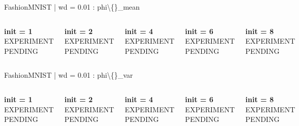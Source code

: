 \documentclass[aspectratio=169]{beamer}
\begin{document}
\begin{frame}{FashionMNIST | wd = 0.01 : phi\textbackslash\{\}\_mean}
\begin{columns}[T,onlytextwidth]

    \centering
\textbf{init = 1}\\[0.5em]
\vfill
{\Large EXPERIMENT PENDING}
\vfill

    \centering
\textbf{init = 2}\\[0.5em]
\vfill
{\Large EXPERIMENT PENDING}
\vfill

    \centering
\textbf{init = 4}\\[0.5em]
\vfill
{\Large EXPERIMENT PENDING}
\vfill

    \centering
\textbf{init = 6}\\[0.5em]
\vfill
{\Large EXPERIMENT PENDING}
\vfill

    \centering
\textbf{init = 8}\\[0.5em]
\vfill
{\Large EXPERIMENT PENDING}
\vfill
\end{columns}
\end{frame}
\begin{frame}{FashionMNIST | wd = 0.01 : phi\textbackslash\{\}\_var}
\begin{columns}[T,onlytextwidth]

    \centering
\textbf{init = 1}\\[0.5em]
\vfill
{\Large EXPERIMENT PENDING}
\vfill

    \centering
\textbf{init = 2}\\[0.5em]
\vfill
{\Large EXPERIMENT PENDING}
\vfill

    \centering
\textbf{init = 4}\\[0.5em]
\vfill
{\Large EXPERIMENT PENDING}
\vfill

    \centering
\textbf{init = 6}\\[0.5em]
\vfill
{\Large EXPERIMENT PENDING}
\vfill

    \centering
\textbf{init = 8}\\[0.5em]
\vfill
{\Large EXPERIMENT PENDING}
\vfill
\end{columns}
\end{frame}
\end{document}
